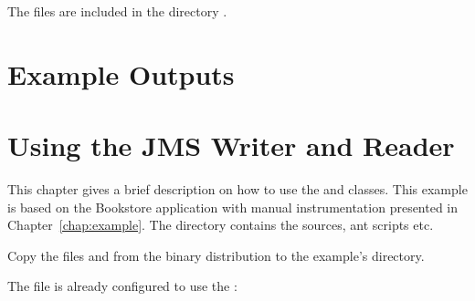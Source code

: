 The files are included in the directory \file{\aspectJBookstoreApplicationDirDistro{}/}.
      \setXMLListing
           
      

\chapter{Example \KiekerTraceAnalysis{} Outputs}\label{appendix:traceAnalysisOutputExamples}


\chapter{Using the JMS Writer and Reader}\label{appendix:usingJMS}

This chapter gives a brief description on how to use the  and  %
classes. This example is based on the Bookstore %
application with manual instrumentation presented in Chapter~\ref{chap:example}. %
The directory \dir{\JMSBookstoreApplicationDirDistro/} contains the %
sources, ant scripts etc. 


\begin{compactenum}
\item Copy the files \file{\mainJar} and \file{\commonsLoggingJar} from the %
binary distribution to the example's  directory.
\item The file  %
is already configured to use the :
\end{compactenum}

\setPropertiesListing


